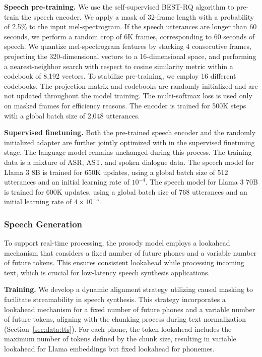 \documentclass[dvipsnames]{fairmeta}
\begin{document}
\textbf{Speech pre-training.}
We use the self-supervised BEST-RQ algorithm \citep{chiu2022self} to pre-train the speech encoder.
We apply a mask of 32-frame length with a probability of 2.5\% to the input mel-spectrogram.
If the speech utterances are longer than 60 seconds, we perform a random crop of 6K frames, corresponding to 60 seconds of speech.
We quantize mel-spectrogram features by stacking 4 consecutive frames, projecting the 320-dimensional vectors to a 16-dimensional space, and performing a nearest-neighbor search with respect to cosine similarity metric within a codebook of 8,192 vectors.
To stabilize pre-training, we employ 16 different codebooks.
The projection matrix and codebooks are randomly initialized and are not updated throughout the model training.
The multi-softmax loss is used only on masked frames for efficiency reasons.
The encoder is trained for 500K steps with a global batch size of 2,048 utterances.

\textbf{Supervised finetuning.}
Both the pre-trained speech encoder and the randomly initialized adapter are further jointly optimized with \llamathree in the supervised finetuning stage. The language model remains unchanged during this process.
The training data is a mixture of ASR, AST, and spoken dialogue data.
The speech model for Llama 3 8B is trained for 650K updates, using a global batch size of 512 utterances and an initial learning rate of $10^{-4}$.
The speech model for Llama 3 70B is trained for 600K updates, using a global batch size of 768 utterances and an initial learning rate of $4\times10^{-5}$.

\subsubsection{Speech Generation}
To support real-time processing, the prosody model employs a lookahead mechanism that considers a fixed number of future phones and a variable number of future tokens. This ensures consistent lookahead while processing incoming text, which is crucial for low-latency speech synthesis applications.

\textbf{Training.} We develop a dynamic alignment strategy utilizing causal masking to facilitate streamability in speech synthesis. This strategy incorporates a lookahead mechanism for a fixed number of future phones and a variable number of future tokens, aligning with the chunking process during text normalization (Section~\ref{sec:data:tts}). For each phone, the token lookahead includes the maximum number of tokens defined by the chunk size, resulting in variable lookahead for Llama embeddings but fixed lookahead for phonemes.
\end{document}
